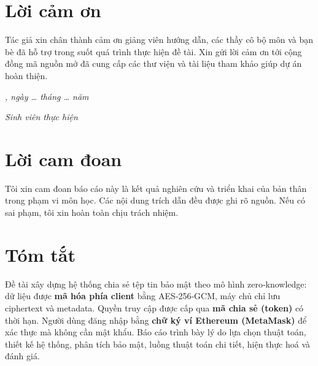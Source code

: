 \chapter*{Lời cảm ơn}
Tác giả xin chân thành cảm ơn giảng viên hướng dẫn, các thầy cô bộ môn và bạn bè đã hỗ trợ trong suốt quá trình thực hiện đề tài. Xin gửi lời cảm ơn tới cộng đồng mã nguồn mở đã cung cấp các thư viện và tài liệu tham khảo giúp dự án hoàn thiện.

\vspace{0.6cm}
\hfill \textit{\DiaDiem, ngày … tháng … năm \Nam}\par
\hfill \textit{Sinh viên thực hiện}

\chapter*{Lời cam đoan}
Tôi xin cam đoan báo cáo này là kết quả nghiên cứu và triển khai của bản thân trong phạm vi môn học. Các nội dung trích dẫn đều được ghi rõ nguồn. Nếu có sai phạm, tôi xin hoàn toàn chịu trách nhiệm.

\chapter*{Tóm tắt}
Đề tài xây dựng hệ thống chia sẻ tệp tin bảo mật theo mô hình zero‑knowledge: dữ liệu được \textbf{mã hóa phía client} bằng AES‑256‑GCM, máy chủ chỉ lưu ciphertext và metadata. Quyền truy cập được cấp qua \textbf{mã chia sẻ (token)} có thời hạn. Người dùng đăng nhập bằng \textbf{chữ ký ví Ethereum (MetaMask)} để xác thực mà không cần mật khẩu. Báo cáo trình bày lý do lựa chọn thuật toán, thiết kế hệ thống, phân tích bảo mật, luồng thuật toán chi tiết, hiện thực hoá và đánh giá.

